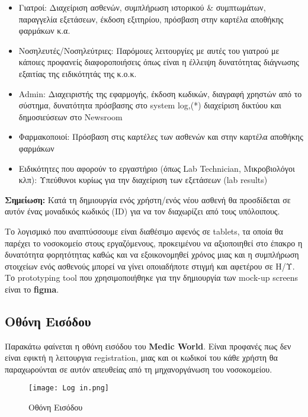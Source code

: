 \documentclass{article}
\begin{document}
\begin{itemize}
  \item Γιατροί: Διαχείριση ασθενών, συμπλήρωση ιστορικού \& συμπτωμάτων, παραγγελία εξετάσεων, έκδοση εξιτηρίου, πρόσβαση στην καρτέλα αποθήκης φαρμάκων κ.α.
  \item Νοσηλευτές/Νοσηλεύτριες: Παρόμοιες λειτουργίες με αυτές του γιατρού με κάποιες προφανείς διαφοροποιήσεις όπως είναι η έλλειψη δυνατότητας διάγνωσης εξαιτίας της ειδικότητάς της κ.ο.κ.
  \item Admin: Διαχειριστής της εφαρμογής, έκδοση κωδικών, διαγραφή χρηστών από το σύστημα, δυνατότητα πρόσβασης στο system log,(*) διαχείριση δικτύου και δημοσιεύσεων στο Newsroom
  \item Φαρμακοποιοί: Πρόσβαση στις καρτέλες των ασθενών και στην καρτέλα αποθήκης φαρμάκων
  \item Ειδικότητες που αφορούν το εργαστήριο (όπως Lab Technician, Μικροβιολόγοι κλπ): Υπεύθυνοι κυρίως για την διαχείριση των εξετάσεων (lab results)
\end{itemize}

\textbf{Σημείωση:} Κατά τη δημιουργία ενός χρήστη/ενός νέου ασθενή θα προσδίδεται σε αυτόν ένας μοναδικός κωδικός (ID) για να τον διαχωρίζει από τους υπόλοιπους. \vspace{0.3cm}

Το λογισμικό που αναπτύσσουμε είναι διαθέσιμο αφενός σε tablets, τα οποία θα παρέχει το νοσοκομείο στους εργαζόμενους, προκειμένου να αξιοποιηθεί στο έπακρο η δυνατότητα φορητότητας καθώς και να εξοικονομηθεί χρόνος μιας και η συμπλήρωση στοιχείων ενός ασθενούς μπορεί να γίνει οποιαδήποτε στιγμή και αφετέρου σε Η/Υ. Το prototyping tool που χρησιμοποιήθηκε για την δημιουργία των mock-up screens είναι το \textbf{figma}.

\subsection{Οθόνη Εισόδου}

Παρακάτω φαίνεται η οθόνη εισόδου του \textbf{Medic World}. Είναι προφανές πως δεν είναι εφικτή η λειτουργια registration, μιας και οι κωδικοί του κάθε χρήστη θα παραχωρούνται σε αυτόν απευθείας από τη μηχανοργάνωση του νοσοκομείου.

\begin{figure}[!htb]
\centering
\texttt{[image: Log in.png]}
\caption{\label{fig:log in page} Οθόνη Εισόδου}
\end{figure}
\end{document}
